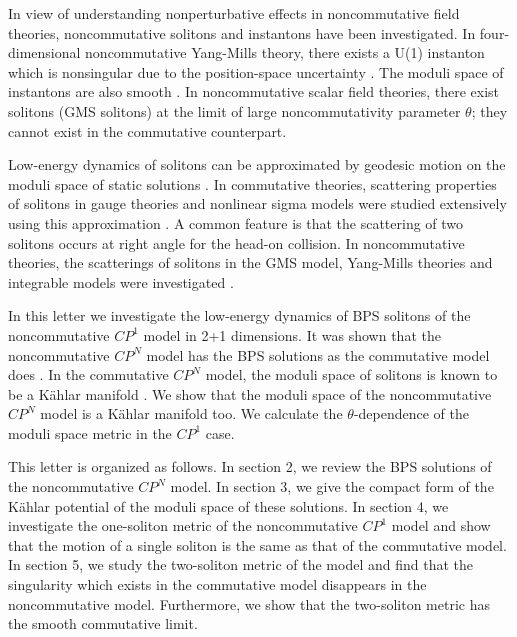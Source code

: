 \documentclass[a4paper,12pt]{article}
\begin{document}
In view of understanding nonperturbative effects in noncommutative field theories,
noncommutative solitons and instantons have been investigated. 
In four-dimensional noncommutative Yang-Mills theory,
there exists a U(1) instanton which is nonsingular 
due to the position-space uncertainty \cite{NS}. The moduli 
space of instantons are also smooth \cite{LTY,Nak}. 
In noncommutative scalar field theories,
there exist solitons (GMS solitons) \cite{GMS}
at the limit of large noncommutativity parameter $\theta$;
they cannot exist in the commutative counterpart.

Low-energy dynamics of solitons can be approximated by
geodesic motion on the moduli space of static solutions \cite{Manton}.
In commutative theories,
scattering properties of solitons in gauge theories and nonlinear sigma models
were studied extensively using this approximation \cite{AH,Ward,Leese}.
A common feature is that 
the scattering of two solitons occurs at right angle for the head-on collision.
In noncommutative theories, 
the scatterings of solitons in 
the GMS model, Yang-Mills theories and integrable models
were investigated \cite{Gopak etc,HIO,LP}.

In this letter
we investigate the low-energy dynamics of
BPS solitons of the noncommutative $CP^1$ model in 2+1 dimensions.
It was shown that the noncommutative $CP^N$ model has the BPS solutions 
as the commutative model does \cite{LLY}. 
In the commutative $CP^N$ model,
the moduli space of solitons is known to be a K\"ahlar manifold \cite{Ruback}.
We show that the moduli space of the noncommutative $CP^N$ model is a K\"ahlar manifold too.
We calculate the $\theta$-dependence of the moduli space metric in the $CP^1$ case.

This letter is organized as follows.
In section 2,
we review the BPS solutions of the noncommutative $CP^N$ model.
In section 3,
we give the compact form of the K\"ahlar potential 
of the moduli space of these solutions.
In section 4,
we investigate the one-soliton metric of the noncommutative $CP^1$ model
and show that the motion of a single soliton is the same as that of the commutative model.
In section 5,
we study the two-soliton metric of the 
model and find that the singularity which exists in the commutative 
model disappears in the noncommutative model.
Furthermore,
we show that the two-soliton metric has the smooth commutative limit.
\end{document}
